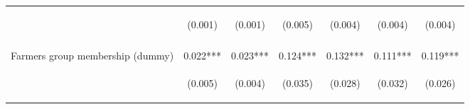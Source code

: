 \begin{center}
\begin{tabular}{lcccccc}
 & \begin{footnotesize}(0.001)\end{footnotesize} & \begin{footnotesize}(0.001)\end{footnotesize} & \begin{footnotesize}(0.005)\end{footnotesize} & \begin{footnotesize}(0.004)\end{footnotesize} & \begin{footnotesize}(0.004)\end{footnotesize} & \begin{footnotesize}(0.004)\end{footnotesize} \\
\vspace{4pt} & \begin{footnotesize}[0.004]\end{footnotesize} & \begin{footnotesize}[0.082]\end{footnotesize} & \begin{footnotesize}[0.000]\end{footnotesize} & \begin{footnotesize}[0.000]\end{footnotesize} & \begin{footnotesize}[0.000]\end{footnotesize} & \begin{footnotesize}[0.000]\end{footnotesize} \\
Farmers group membership (dummy) & 0.022*** & 0.023*** & 0.124*** & 0.132*** & 0.111*** & 0.119*** \\
 & \begin{footnotesize}(0.005)\end{footnotesize} & \begin{footnotesize}(0.004)\end{footnotesize} & \begin{footnotesize}(0.035)\end{footnotesize} & \begin{footnotesize}(0.028)\end{footnotesize} & \begin{footnotesize}(0.032)\end{footnotesize} & \begin{footnotesize}(0.026)\end{footnotesize} \\

\end{tabular}
\end{center}
